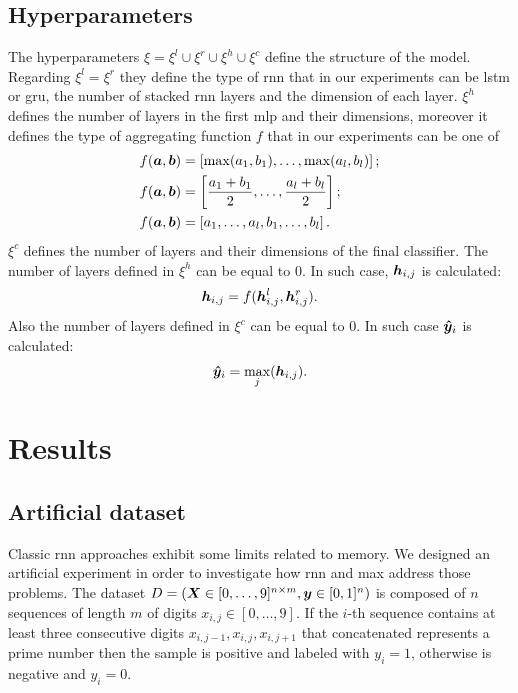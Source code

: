 \subsection{Hyperparameters}
The hyperparameters $\xi=\xi^l\cup\xi^r\cup\xi^h\cup\xi^c$ define the
structure of the model. Regarding $\xi^l=\xi^r$ they define the type
of \ac{rnn} that in our experiments can be \ac{lstm} or \ac{gru}, the
number of stacked \ac{rnn} layers and the dimension of each
layer. $\xi^h$ defines the number of layers in the first
\ac{mlp} and their
dimensions, moreover it defines the type of aggregating function $f$
that in our experiments can be one of
\begin{align}
  f(\bm{a},\bm{b}) &= \left[\max(a_1,b_1),\dots,\max(a_l,b_l)\right];\\
  f(\bm{a},\bm{b}) &= \left[\frac{a_1+b_1}{2},\dots,\frac{a_l+b_l}{2}\right];\\
  f(\bm{a},\bm{b}) &= \left[a_1,\dots,a_l,b_1,\dots,b_l\right].\label{eq:aggregation}
\end{align}
$\xi^c$ defines the number of layers and their dimensions of the
final classifier. The number of layers defined in $\xi^h$ can be
equal to $0$. In such case, $\bm{h}_{i,j}$ is calculated:
\begin{equation*}
  \bm{h}_{i,j} = f(\bm{h}^l_{i,j},\bm{h}^r_{i,j}).
\end{equation*}
Also the number of layers defined in $\xi^c$ can be equal to $0$. In
such case $\bm{\hat{y}}_i$ is calculated:
\begin{equation*}
  \bm{\hat y}_i = \max_j(\bm{h}_{i,j}).
\end{equation*}

\section{Results}
\subsection{Artificial dataset}\label{sec:experiments}
Classic \ac{rnn} approaches exhibit some limits related to
memory. We designed an artificial experiment in
order to investigate how \ac{rnn} and \ac{max} address those
problems. The dataset 
$D=(\bm{X}\in [0,\dots,9]^{n\times m},\bm{y}\in [0,1]^n)$ is
composed of $n$ sequences of length
$m$ of digits $x_{i,j}\in[0,\dots,9]$. If the $i$-th sequence contains
at least three consecutive digits
$x_{i,j-1},x_{i,j},x_{i,j+1}$ that concatenated represents a prime
number then the
sample is positive and labeled with $y_i=1$, otherwise is negative and
$y_i=0$.


